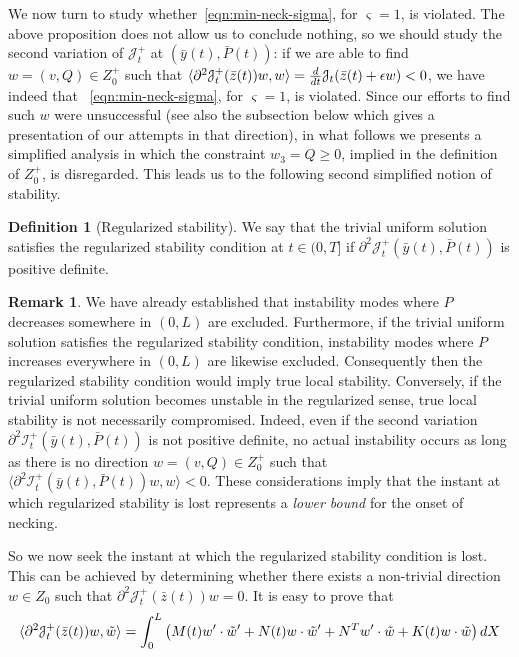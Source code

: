 \documentclass[a4paper,10pt,oneside]{amsbook}
\numberwithin{section}{chapter}
\numberwithin{equation}{chapter}
\theoremstyle{definition}
\newtheorem{defi}[prop]{Definition}
\newtheorem{rmk}[prop]{Remark}
\DeclarePairedDelimiter{\dual}{\langle}{\rangle}
\begin{document}
We now turn to study whether~\eqref{eqn:min-neck-sigma}, for $\varsigma=1$, is violated. The above proposition does not allow us to conclude nothing, so we should study the second variation of $\mathcal{J}_t^+$ at $(\bar{y}(t),\bar P(t))$: if we are able to find $w=(v,Q)\in Z_0^+$ such that $\dual{\partial^2\mathcal{J}_t^+(\bar z(t))w,w}=\frac{d}{dt}\mathcal{J}_t(\bar z(t)+\epsilon w)<0$, we have indeed that ~\eqref{eqn:min-neck-sigma}, for $\varsigma=1$, is violated. Since our efforts to find such $w$ were unsuccessful (see also the subsection below which gives a presentation of our attempts in that direction), in what follows we presents a simplified analysis in which the constraint $w_3=Q\ge0$, implied in the definition of $Z_0^+$, is disregarded. This leads us to the following second simplified notion of stability.
\begin{defi}[Regularized stability]
We say that the trivial uniform solution satisfies the regularized stability condition at $t\in(0,T]$ if $\partial^2\mathcal{J}_t^+(\bar y(t),\bar P(t))$ is positive definite.
\end{defi}
\begin{rmk}
\label{rmk:stability-regularized}
We have already established that instability modes where $P$ decreases somewhere in $(0,L)$ are excluded. Furthermore, if the trivial uniform solution satisfies the regularized stability condition, instability modes where $P$ increases everywhere in $(0,L)$ are likewise excluded. Consequently then the regularized stability condition would imply true local stability. Conversely, if the trivial uniform solution becomes unstable in the regularized sense, true local stability is not necessarily compromised. Indeed, even if the second variation $\partial^2\mathcal{I}_t^+(\bar{y}(t),\bar{P}(t))$ is not positive definite, no actual instability occurs as long as there is no direction $w=(v,Q) \in Z_0^+$ such that $\langle\partial^2\mathcal{I}_t^+(\bar{y}(t),\bar{P}(t))w,w\rangle<0$. These considerations imply that the instant at which regularized stability is lost represents a \emph{lower bound} for the onset of necking.
\end{rmk}
So we now seek the instant at which the regularized stability condition is lost. This can be achieved by determining whether there exists a non-trivial direction $w\in Z_0$ such that $\partial^2\mathcal{J}_t^+(\bar{z}(t))w = 0$. It is easy to prove that
\[
\dual{\partial^2\mathcal{J}_t^+(\bar z(t))w,\tilde w}=\int_0^L\left(M(t)w'\cdot \tilde w'+N(t)w\cdot\tilde w'+N^Tw'\cdot\tilde w+K(t)w\cdot\tilde w\right)dX
\]
\end{document}
